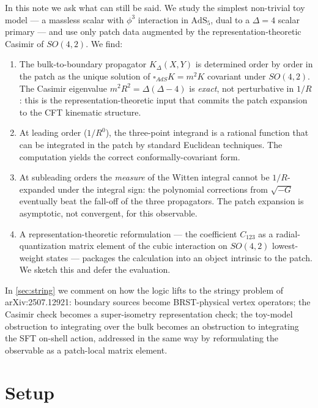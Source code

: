 \documentclass[11pt]{article}
\newcommand{\AdSf}{\mathrm{AdS}_5}
\renewcommand{\Box}{\square}
\begin{document}
In this note we ask what can still be said. We study the simplest non-trivial toy model --- a massless scalar with $\phi^3$ interaction in $\AdSf$, dual to a $\Delta=4$ scalar primary --- and use only patch data augmented by the representation-theoretic Casimir of $SO(4,2)$. We find:

\begin{enumerate}
\item The bulk-to-boundary propagator $K_\Delta(X,Y)$ is determined order by order in the patch as the unique solution of $\Box_{AdS} K = m^2 K$ covariant under $SO(4,2)$. The Casimir eigenvalue $m^2 R^2 = \Delta(\Delta{-}4)$ is \emph{exact}, not perturbative in $1/R$: this is the representation-theoretic input that commits the patch expansion to the CFT kinematic structure.

\item At leading order ($1/R^0$), the three-point integrand is a rational function that can be integrated in the patch by standard Euclidean techniques. The computation yields the correct conformally-covariant form.

\item At subleading orders the \emph{measure} of the Witten integral cannot be $1/R$-expanded under the integral sign: the polynomial corrections from $\sqrt{-G}$ eventually beat the fall-off of the three propagators. The patch expansion is asymptotic, not convergent, for this observable.

\item A representation-theoretic reformulation --- the coefficient $C_{123}$ as a radial-quantization matrix element of the cubic interaction on $SO(4,2)$ lowest-weight states --- packages the calculation into an object intrinsic to the patch. We sketch this and defer the evaluation.
\end{enumerate}

In \cref{sec:string} we comment on how the logic lifts to the stringy problem of arXiv:2507.12921: boundary sources become BRST-physical vertex operators; the Casimir check becomes a super-isometry representation check; the toy-model obstruction to integrating over the bulk becomes an obstruction to integrating the SFT on-shell action, addressed in the same way by reformulating the observable as a patch-local matrix element.

\section{Setup}\label{sec:setup}
\end{document}
